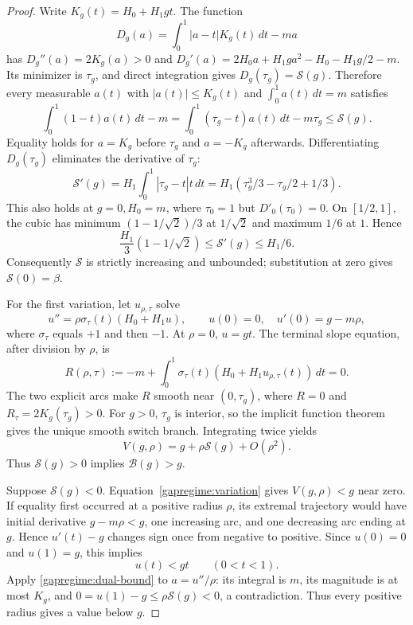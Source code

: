 \begin{proof}\label{gapregime:proof}
Write $K_g(t)=H_0+H_1gt$. The function
\[
 D_g(a)=\int_0^1|a-t|K_g(t)\,dt-ma
\]
has $D_g''(a)=2K_g(a)>0$ and
$D_g'(a)=2H_0a+H_1ga^2-H_0-H_1g/2-m$.
Its minimizer is $\tau_g$, and direct integration gives
$D_g(\tau_g)=\mathcal S(g)$. Therefore every measurable $a(t)$ with
$|a(t)|\le K_g(t)$ and $\int_0^1a(t)\,dt=m$ satisfies
\begin{equation}\label{gapregime:dual-bound}
 \int_0^1(1-t)a(t)\,dt-m
 =\int_0^1(\tau_g-t)a(t)\,dt-m\tau_g
 \le\mathcal S(g).
\end{equation}
Equality holds for $a=K_g$ before $\tau_g$ and $a=-K_g$ afterwards.
Differentiating $D_g(\tau_g)$ eliminates the derivative of $\tau_g$:
\[
 \mathcal S'(g)=H_1\int_0^1|\tau_g-t|t\,dt
 =H_1(\tau_g^3/3-\tau_g/2+1/3).
\]
This also holds at $g=0,H_0=m$, where $\tau_0=1$ but
$D'_0(\tau_0)=0$. On $[1/2,1]$, the cubic has minimum
$(1-1/\sqrt2)/3$ at $1/\sqrt2$ and maximum $1/6$ at $1$. Hence
\begin{equation}\label{gapregime:derivative-bounds}
 \frac{H_1}{3}(1-1/\sqrt2)\le\mathcal S'(g)\le H_1/6.
\end{equation}
Consequently $\mathcal S$ is strictly increasing and unbounded;
substitution at zero gives $\mathcal S(0)=\beta$.

For the first variation, let $u_{\rho,\tau}$ solve
\[
 u''=\rho\sigma_\tau(t)(H_0+H_1u),\qquad
 u(0)=0,\quad u'(0)=g-m\rho,
\]
where $\sigma_\tau$ equals $+1$ and then $-1$.
At $\rho=0$, $u=gt$. The terminal slope equation, after division by
$\rho$, is
\[
 R(\rho,\tau):=-m+
   \int_0^1\sigma_\tau(t)(H_0+H_1u_{\rho,\tau}(t))\,dt=0.
\]
The two explicit arcs make $R$ smooth near $(0,\tau_g)$, where
$R=0$ and $R_\tau=2K_g(\tau_g)>0$.
For $g>0$, $\tau_g$ is interior, so the implicit function theorem
gives the unique smooth switch branch. Integrating twice yields
\begin{equation}\label{gapregime:variation}
 V(g,\rho)=g+\rho\mathcal S(g)+O(\rho^2).
\end{equation}
Thus $\mathcal S(g)>0$ implies $\mathcal B(g)>g$.

Suppose $\mathcal S(g)<0$. Equation~\eqref{gapregime:variation} gives
$V(g,\rho)<g$ near zero. If equality first occurred at a positive
radius $\rho$, its extremal trajectory would have initial derivative
$g-m\rho<g$, one increasing arc, and one decreasing arc ending at $g$.
Hence $u'(t)-g$ changes sign once from negative to positive.
Since $u(0)=0$ and $u(1)=g$, this implies
\begin{equation}\label{gapregime:below-line}
 u(t)<gt\qquad(0<t<1).
\end{equation}
Apply \eqref{gapregime:dual-bound} to $a=u''/\rho$:
its integral is $m$, its magnitude is at most $K_g$, and
$0=u(1)-g\le\rho\mathcal S(g)<0$, a contradiction.
Thus every positive radius gives a value below $g$.


\end{proof}
